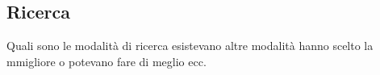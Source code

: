 \subsection{Ricerca} \label{Ricerca}
Quali sono le modalità di ricerca esistevano altre modalità hanno scelto la mmigliore o potevano fare di meglio ecc.